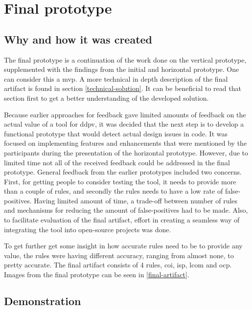 \documentclass{report}
\begin{document}
\section{Final prototype}

\subsection*{Why and how it was created}
The final prototype is a continuation of the work done on the vertical prototype, supplemented with the findings from the initial and horizontal prototype. One can consider this a \gls{mvp}. A more technical in depth description of the final artifact is found in section \ref{technical-solution}. It can be beneficial to read that section first to get a better understanding of the developed solution.

Because earlier approaches for feedback gave limited amounts of feedback on the actual value of a tool for \gls{ddpv}, it was decided that the next step is to develop a functional prototype that would detect actual design issues in code. It was focused on implementing features and enhancements that were mentioned by the participants during the presentation of the horizontal prototype. However, due to limited time not all of the received feedback could be addressed in the final prototype. General feedback from the earlier prototypes included two concerns. First, for getting people to consider testing the tool, it needs to provide more than a couple of rules, and secondly the rules needs to have a low rate of false-positives. Having limited amount of time, a trade-off between number of rules and mechanisms for reducing the amount of false-positives had to be made. Also, to facilitate evaluation of the final artifact, effort in creating a seamless way of integrating the tool into open-source projects was done. 

To get further get some insight in how accurate rules need to be to provide any value, the rules were having different accuracy, ranging from almost none, to pretty accurate. The final artifact consists of 4 rules, \gls{coi}, \gls{isp}, \gls{lcom} and \gls{ocp}. Images from the final prototype can be seen in \ref{final-artifact}.

\subsection*{Demonstration}
\end{document}
